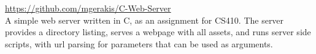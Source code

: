 \documentclass[letterpaper]{deedy-resume} %
\begin{document}
\begin{minipage}[t]{0.66\textwidth}
    \sectionspace %


    \url{https://github.com/mgerakis/C-Web-Server} \\
    A simple web server written in C, as an assignment for CS410. The server provides a directory listing, serves a webpage with all assets, and runs server side scripts, with url parsing for parameters that can be used as arguments.

    \sectionspace %


  \end{minipage} %
\end{document}

